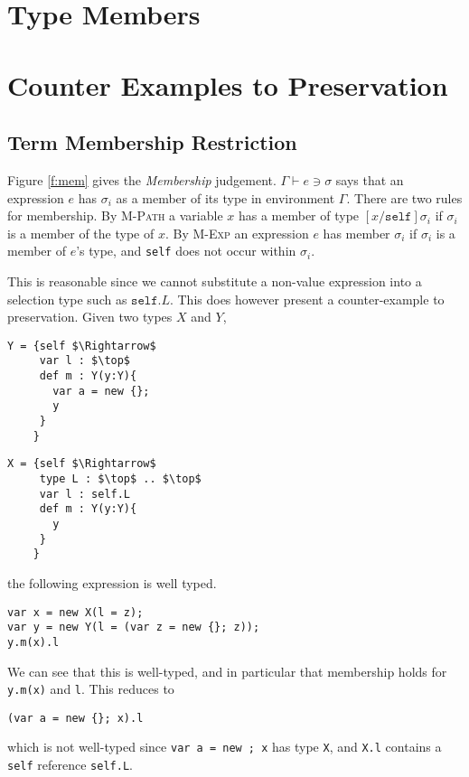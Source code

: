 \documentclass{llncs}
\begin{document}
\section{Type Members}

\section{Counter Examples to Preservation}
	\label{s:examples}

\subsection{Term Membership Restriction}
Figure \ref{f:mem} gives the \emph{Membership} judgement. 
$\Gamma \vdash e \ni \sigma$ says that an expression $e$ 
has $\sigma_i$ as a member of its type in environment $\Gamma$. 
There are two rules for membership. By \textsc{M-Path} a 
variable $x$ has a member of type $[x/\texttt{self}]\sigma_i$ 
if $\sigma_i$ is a member of the type of $x$. By \textsc{M-Exp}
an expression $e$ has member $\sigma_i$ if $\sigma_i$ is 
a member of $e$'s type, and \texttt{self} does not occur 
within $\sigma_i$.

This is reasonable since we cannot substitute a non-value 
expression into a selection type such as $\texttt{self}.L$. 
This does however present a counter-example to preservation. 
Given two types $X$ and $Y$,

\begin{lstlisting}[mathescape, style=custom_lang]
Y = {self $\Rightarrow$
     var l : $\top$
     def m : Y(y:Y){
       var a = new {};
       y
     }
    }
\end{lstlisting}
\begin{lstlisting}[mathescape, style=custom_lang]
X = {self $\Rightarrow$
     type L : $\top$ .. $\top$
     var l : self.L
     def m : Y(y:Y){
       y
     }
    }
\end{lstlisting}

the following expression is well typed.
\begin{lstlisting}[mathescape, style=custom_lang]
var x = new X(l = z);
var y = new Y(l = (var z = new {}; z));
y.m(x).l
\end{lstlisting}
We can see that this is well-typed, and in particular that membership 
holds for \texttt{y.m(x)} and \texttt{l}. This reduces to 
\begin{lstlisting}[mathescape, style=custom_lang]
(var a = new {}; x).l
\end{lstlisting}
which is not well-typed since \texttt{var a = new {}; x} has type 
\texttt{X}, and \texttt{X.l} contains a \texttt{self} reference 
\texttt{self.L}.
\end{document}
